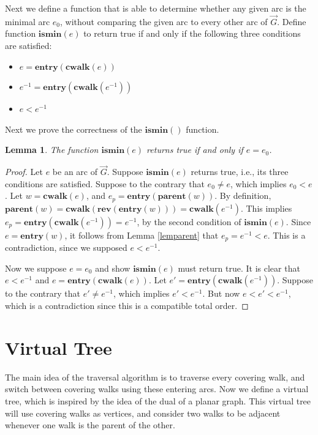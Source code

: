 \documentclass[12pt,letterpaper,oneside]{book}
\newcommand{\rev}{\textbf{rev}}
\newcommand{\cwalk}{\textbf{cwalk}}
\newcommand{\entry}{\textbf{entry}}
\newcommand{\parent}{\textbf{parent}}
\newcommand{\ismin}{\textbf{ismin}}
\newtheorem{lemma}[theorem]{Lemma}
\begin{document}

Next we define a function that is able to determine whether any given arc is the minimal arc $e_0$, without comparing the given arc 
to every other arc of $\vec{G}$.  
Define function $\ismin(e)$ to return true if and only if the following three conditions are satisfied:
\begin{itemize}
\item $e = \entry(\cwalk(e))$
\item $e^{-1} = \entry(\cwalk(e^{-1}))$
\item $e < e^{-1}$
\end{itemize}


Next we prove the correctness of the $\ismin()$ function.

\begin{lemma}
\label{lemismin}
The function $\ismin(e)$ returns true if and only if $e=e_0$.
\end{lemma}
\begin{proof}
Let $e$ be an arc of $\vec{G}$.  Suppose $\ismin(e)$ returns true, i.e., its three 
conditions are satisfied.  Suppose to the contrary 
that $e_0 \ne e$, which implies $e_0<e$.  Let $w=\cwalk(e)$, and $e_p = \entry(\parent(w))$.  By definition, 
$\parent(w) =\cwalk(\rev(\entry(w))) = \cwalk(e^{-1})$.  This implies $e_p = \entry(\cwalk(e^{-1})) =e^{-1}$, 
by the second condition of $\ismin(e)$.  Since $e=\entry(w)$, it follows 
from Lemma \ref{lemparent} that $e_p=e^{-1} < e$.  This is a contradiction, since we supposed $e<e^{-1}$.  
 
Now we suppose $e=e_0$ and show $\ismin(e)$ must return true.  
It is clear that $e<e^{-1}$ and $e = \entry(\cwalk(e))$.  Let $e'=\entry(\cwalk(e^{-1}))$.  Suppose 
to the contrary that $e'\ne e^{-1}$, which implies $e'<e^{-1}$.  But now $e < e' < e^{-1}$, which is a contradiction since this is a compatible total order. 
\end{proof}



\newpage
\section{Virtual Tree}
\label{ss-virtualtree}



The main idea of the traversal algorithm is to traverse every covering walk, and switch between covering 
walks using these entering arcs.  Now we define a virtual tree, which is inspired 
by the idea of the dual of a planar graph.  
This virtual tree will use covering walks as vertices, and consider two walks to be adjacent whenever one walk is the parent of the other.  
\end{document}
